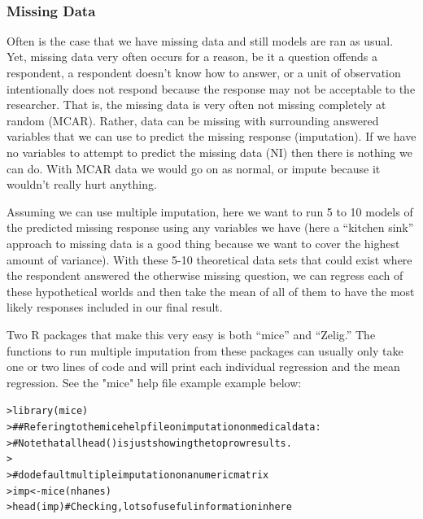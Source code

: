 \documentclass[12pt]{article}\usepackage[]{graphicx}\usepackage[]{color}
\makeatletter
\newcommand{\hlcom}[1]{\textcolor[rgb]{0.404,0.408,0.42}{#1}}%
\newcommand{\hlstd}[1]{\textcolor[rgb]{0.882,0.878,0.898}{#1}}%
\newcommand{\hlkwb}[1]{\textcolor[rgb]{0.902,0.675,0.196}{#1}}%
\newcommand{\hlkwd}[1]{\textcolor[rgb]{0.733,0.388,0.812}{#1}}%
\newenvironment{kframe}{%
 \def\at@end@of@kframe{}%
 \ifinner\ifhmode%
  \def\at@end@of@kframe{\end{minipage}}%
  \begin{minipage}{\columnwidth}%
 \fi\fi%
 \def\FrameCommand##1{\hskip\@totalleftmargin \hskip-\fboxsep
 \colorbox{shadecolor}{##1}\hskip-\fboxsep
     \hskip-\linewidth \hskip-\@totalleftmargin \hskip\columnwidth}%
 \MakeFramed {\advance\hsize-\width
   \@totalleftmargin\z@ \linewidth\hsize
   \@setminipage}}%
 {\par\unskip\endMakeFramed%
 \at@end@of@kframe}
\newenvironment{knitrout}{}{} %
\makeatother
\begin{document}
\begin{flushleft}
\hfill \\
\subsubsection{Missing Data}


Often is the case that we have missing data and still models are ran as usual. Yet, missing data very often occurs for a reason, be it a question offends a respondent, a respondent doesn't know how to answer, or a unit of observation intentionally does not respond because the response may not be acceptable to the researcher. That is, the missing data is very often not missing completely at random (MCAR). Rather, data can be missing with surrounding answered variables that we can use to predict the missing response (imputation). If we have no variables to attempt to predict the missing data (NI) then there is nothing we can do. With MCAR data we would go on as normal, or impute because it wouldn't really hurt anything.

Assuming we can use multiple imputation, here we want to run 5 to 10 models of the predicted missing response using any variables we have (here a ``kitchen sink'' approach to missing data is a good thing because we want to cover the highest amount of variance). With these 5-10 theoretical data sets that could exist where the respondent answered the otherwise missing question, we can regress each of these hypothetical worlds and then take the mean of all of them to have the most likely responses included in our final result.

Two R packages that make this very easy is both ``mice'' and ``Zelig.'' The functions to run multiple imputation from these packages can usually only take one or two lines of code and will print each individual regression and the mean regression. See the "mice" help file example example below:

\begin{knitrout}
\color{fgcolor}\begin{kframe}
\begin{alltt}
\hlstd{> }\hlkwd{library}\hlstd{(mice)}
\hlstd{> }\hlcom{## Refering to the mice help file on imputation on medical data:}
\hlstd{> }\hlcom{#  Note that all head() is just showing the top row results.}
\hlstd{> }
\hlstd{> }\hlcom{# do default multiple imputation on a numeric matrix}
\hlstd{> }\hlstd{imp} \hlkwb{<-} \hlkwd{mice}\hlstd{(nhanes)}
\hlstd{> }\hlkwd{head}\hlstd{(imp)}  \hlcom{# Checking, lots of useful information in here}
\end{alltt}
\end{kframe}
\end{knitrout}


\end{flushleft}
\end{document}
